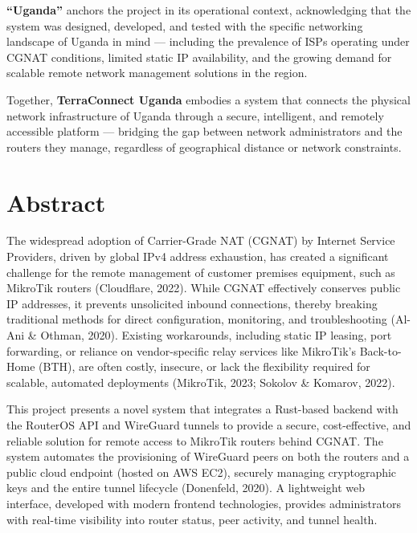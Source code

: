 \documentclass[12pt,a4paper,oneside]{report}
\begin{document}
\textbf{``Uganda''} anchors the project in its operational context, acknowledging that the system was designed, developed, and tested with the specific networking landscape of Uganda in mind --- including the prevalence of ISPs operating under CGNAT conditions, limited static IP availability, and the growing demand for scalable remote network management solutions in the region.

Together, \textbf{TerraConnect Uganda} embodies a system that connects the physical network infrastructure of Uganda through a secure, intelligent, and remotely accessible platform --- bridging the gap between network administrators and the routers they manage, regardless of geographical distance or network constraints.

\clearpage
\chapter*{Abstract}

The widespread adoption of Carrier-Grade NAT (CGNAT) by Internet Service Providers, driven by global IPv4 address exhaustion, has created a significant challenge for the remote management of customer premises equipment, such as MikroTik routers (Cloudflare, 2022). While CGNAT effectively conserves public IP addresses, it prevents unsolicited inbound connections, thereby breaking traditional methods for direct configuration, monitoring, and troubleshooting (Al-Ani \& Othman, 2020). Existing workarounds, including static IP leasing, port forwarding, or reliance on vendor-specific relay services like MikroTik's Back-to-Home (BTH), are often costly, insecure, or lack the flexibility required for scalable, automated deployments (MikroTik, 2023; Sokolov \& Komarov, 2022).

This project presents a novel system that integrates a Rust-based backend with the RouterOS API and WireGuard tunnels to provide a secure, cost-effective, and reliable solution for remote access to MikroTik routers behind CGNAT. The system automates the provisioning of WireGuard peers on both the routers and a public cloud endpoint (hosted on AWS EC2), securely managing cryptographic keys and the entire tunnel lifecycle (Donenfeld, 2020). A lightweight web interface, developed with modern frontend technologies, provides administrators with real-time visibility into router status, peer activity, and tunnel health.
\end{document}
